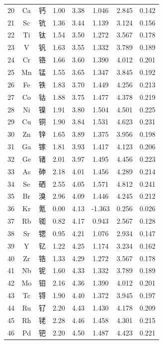 \documentclass[11pt,a4paper]{article}
\begin{document}
\begin{longtable}{|c|c|p{2.5cm}|c|c|c|c|c|}
		20 & Ca & 钙 & 1.00 & 3.38 & 1.046  & 2.845  & 0.142 \\
		21 & Sc & 钪 & 1.36 & 3.44 & 1.139  & 3.124  & 0.156 \\
		22 & Ti & 钛 & 1.54 & 3.50 & 1.272  & 3.567  & 0.178 \\
		23 & V  & 钒 & 1.63 & 3.55 & 1.332  & 3.789  & 0.189 \\
		24 & Cr & 铬 & 1.66 & 3.60 & 1.390  & 4.012  & 0.201 \\
		25 & Mn & 锰 & 1.55 & 3.65 & 1.347  & 3.845  & 0.192 \\
		26 & Fe & 铁 & 1.83 & 3.70 & 1.449  & 4.256  & 0.213 \\
		27 & Co & 钴 & 1.88 & 3.75 & 1.477  & 4.378  & 0.219 \\
		28 & Ni & 镍 & 1.91 & 3.80 & 1.504  & 4.501  & 0.225 \\
		29 & Cu & 铜 & 1.90 & 3.84 & 1.531  & 4.623  & 0.231 \\
		30 & Zn & 锌 & 1.65 & 3.89 & 1.375  & 3.956  & 0.198 \\
		31 & Ga & 镓 & 1.81 & 3.93 & 1.417  & 4.123  & 0.206 \\
		32 & Ge & 锗 & 2.01 & 3.97 & 1.495  & 4.456  & 0.223 \\
		33 & As & 砷 & 2.18 & 4.01 & 1.456  & 4.289  & 0.214 \\
		34 & Se & 硒 & 2.55 & 4.05 & 1.571  & 4.812  & 0.241 \\
		35 & Br & 溴 & 2.96 & 4.09 & 1.446  & 4.245  & 0.212 \\
		36 & Kr & 氪 & 0.00 & 4.13 & -1.363 & 0.256  & 0.026 \\
		37 & Rb & 铷 & 0.82 & 4.17 & 0.943  & 2.567  & 0.128 \\
		38 & Sr & 锶 & 0.95 & 4.21 & 1.076  & 2.934  & 0.147 \\
		39 & Y  & 钇 & 1.22 & 4.25 & 1.174  & 3.234  & 0.162 \\
		40 & Zr & 锆 & 1.33 & 4.29 & 1.272  & 3.567  & 0.178 \\
		41 & Nb & 铌 & 1.60 & 4.33 & 1.332  & 3.789  & 0.189 \\
		42 & Mo & 钼 & 2.16 & 4.36 & 1.390  & 4.012  & 0.201 \\
		43 & Tc & 锝 & 1.90 & 4.40 & 1.372  & 3.945  & 0.197 \\
		44 & Ru & 钌 & 2.20 & 4.43 & 1.430  & 4.178  & 0.209 \\
		45 & Rh & 铑 & 2.28 & 4.46 & 1.458  & 4.301  & 0.215 \\
		46 & Pd & 钯 & 2.20 & 4.50 & 1.487  & 4.423  & 0.221 \\

\end{longtable}
\end{document}
